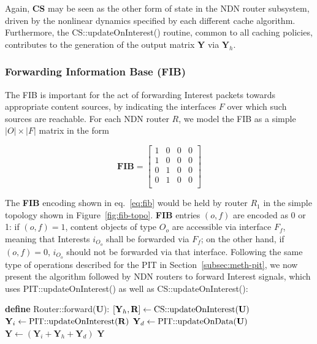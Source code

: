 Again, \textbf{CS} may be seen as the other form of state in the NDN router 
subsystem, driven by the nonlinear dynamics specified by each different 
cache algorithm. Furthermore, the CS::updateOnInterest() 
routine, common to all caching policies, contributes to the generation of the 
output matrix \textbf{Y} via $\textbf{Y}_h$.\shortvertbreak

\subsubsection{Forwarding Information Base (FIB)}
\label{subsec:meth-fib}

The FIB is important for the act of forwarding Interest packets towards 
appropriate content sources, by indicating the interfaces $F$ over which such 
sources are reachable. For each NDN router $R$, we model the FIB as a simple 
$|O| \times |F|$ matrix in the form

\begin{equation}
\textbf{FIB} = \begin{bmatrix} 1 & 0 & 0 & 0  \\ 
                1 & 0 & 0 & 0               \\ 
                0 & 1 & 0 & 0               \\ 
                0 & 1 & 0 & 0               \\ \end{bmatrix}
    \label{eq:fib}
\end{equation}\shortvertbreak

The \textbf{FIB} encoding shown in eq.~\ref{eq:fib} would be held by router $R_1$ in the 
simple topology shown in Figure~\ref{fig:fib-topo}. \textbf{FIB} entries 
$(o,f)$ are encoded as 0 or 1: if $(o,f) = 1$, content objects of 
type $O_o$ are accessible via interface $F_f$, meaning that Interests 
$i_{O_o}$ shall be forwarded via $F_f$; on the other hand, 
if $(o,f) = 0$, $i_{O_o}$ should not be forwarded via that interface. 
Following the same type of operations described for the PIT 
in Section~\ref{subsec:meth-pit}, we now present the algorithm followed by NDN 
routers to forward Interest signals, which uses PIT::updateOnInterest() as well 
as CS::updateOnInterest():\shortvertbreak 

\begin{algorithmic}[1]

\State \textbf{define} Router::forward($\textbf{U}$):
    \Statex[2]
    \State $[\textbf{Y}_h, \textbf{R}] \leftarrow \text{CS::updateOnInterest(\textbf{U})}$
    \State $\textbf{Y}_i \leftarrow \text{PIT::updateOnInterest(\textbf{R})}$
    \State $\textbf{Y}_d \leftarrow \text{PIT::updateOnData(\textbf{U})}$
    \State $\textbf{Y} \leftarrow (\textbf{Y}_i + \textbf{Y}_h + \textbf{Y}_d)$
    \State \Return $\textbf{Y}$

\end{algorithmic}\shortvertbreak

